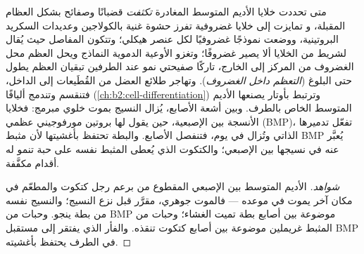 \begin{proposition}\label{prop:b2:limb-organogenesis:skeleton}
متى تحددت خلايا الأديم المتوسط المغادرة 
\emph{تكثفت} قضبانًا وصفائح بشكل العظام المقبلة، و
تمايزت إلى خلايا غضروفية تفرز حشوة غنية
بالكولاجين وعديدات السكريد البروتينية، ووضعت نموذجًا غضروفيًا لكل
عنصر هيكلي؛ وتتكون المفاصل حيث يُقال لشريط من الخلايا ألا
يصير غضروفًا؛ وتغزو الأوعية الدموية النماذج ويحل العظم محل
الغضروف من المركز إلى الخارج، تاركًا صفيحتي نمو عند
الطرفين تبقيان العظم يطول حتى البلوغ
(\emph{التعظم داخل الغضروف}). وتهاجر طلائع العضل من
القُطَيعات إلى الداخل، فتنقسم وتندمج أليافًا
(\cref{ch:b2:cell-differentiation}) وترتبط بأوتار يصنعها
الأديم المتوسط الخاص بالطرف. وبين أشعة الأصابع، يُزال النسيج
بموت خلوي مبرمج: فخلايا الأنسجة بين الإصبعية،
حين يقول لها بروتين مورفوجيني عظمي (BMP)، تفعّل
تدميرها الذاتي وتُزال في يوم، فتنفصل
الأصابع. والبطة تحتفظ بأغشيتها لأن مثبط BMP يُعبَّر عنه
في نسيجها بين الإصبعي؛ والكتكوت الذي يُعطى المثبط نفسه على
حبة تنمو له أقدام مكفَّفة.
\end{proposition}
\begin{proof}[شواهد]
الأديم المتوسط بين الإصبعي المقطوع من برعم رجل كتكوت والمطعّم
في مكان آخر يموت في موعده --- فالموت جوهري، مقرَّر
قبل نزع النسيج؛ والنسيج نفسه من بطة ينجو.
وحبات من BMP موضوعة بين أصابع بطة تميت الغشاء؛
وحبات من المثبط غريملين موضوعة بين أصابع كتكوت
تنقذه. والفأر الذي يفتقر إلى مستقبل BMP في الطرف يحتفظ بأغشيته.
\end{proof}

